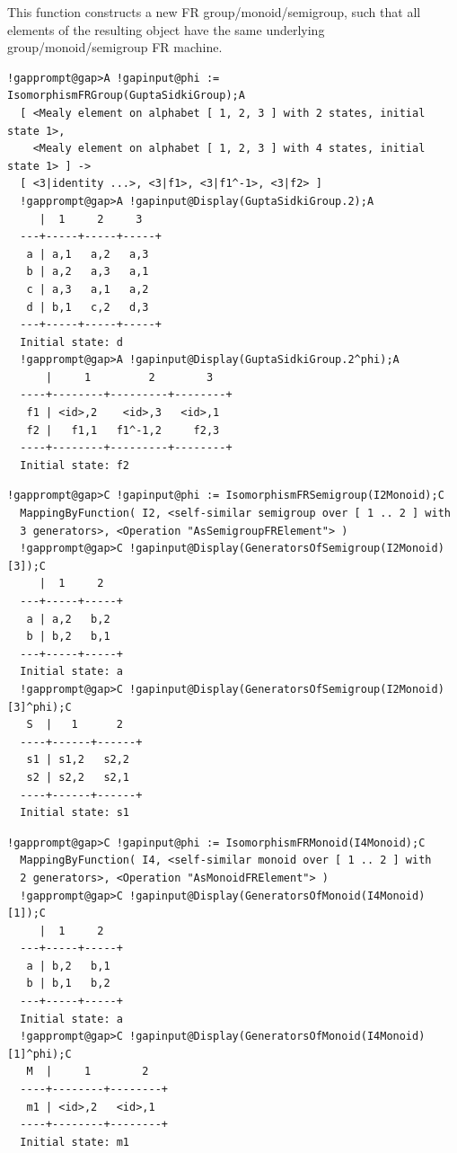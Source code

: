\documentclass[a4paper,11pt]{report}
\begin{document}
{{{ This function constructs a new FR group/monoid/semigroup, such that all
elements of the resulting object have the same underlying
group/monoid/semigroup FR machine. 
\begin{Verbatim}[commandchars=!@A,fontsize=\small,frame=single,label=Example]
  !gapprompt@gap>A !gapinput@phi := IsomorphismFRGroup(GuptaSidkiGroup);A
  [ <Mealy element on alphabet [ 1, 2, 3 ] with 2 states, initial state 1>,
    <Mealy element on alphabet [ 1, 2, 3 ] with 4 states, initial state 1> ] ->
  [ <3|identity ...>, <3|f1>, <3|f1^-1>, <3|f2> ]
  !gapprompt@gap>A !gapinput@Display(GuptaSidkiGroup.2);A
     |  1     2     3
  ---+-----+-----+-----+
   a | a,1   a,2   a,3
   b | a,2   a,3   a,1
   c | a,3   a,1   a,2
   d | b,1   c,2   d,3
  ---+-----+-----+-----+
  Initial state: d
  !gapprompt@gap>A !gapinput@Display(GuptaSidkiGroup.2^phi);A
      |     1         2        3
  ----+--------+---------+--------+
   f1 | <id>,2    <id>,3   <id>,1
   f2 |   f1,1   f1^-1,2     f2,3
  ----+--------+---------+--------+
  Initial state: f2
\end{Verbatim}
 
\begin{Verbatim}[commandchars=!@C,fontsize=\small,frame=single,label=Example]
  !gapprompt@gap>C !gapinput@phi := IsomorphismFRSemigroup(I2Monoid);C
  MappingByFunction( I2, <self-similar semigroup over [ 1 .. 2 ] with
  3 generators>, <Operation "AsSemigroupFRElement"> )
  !gapprompt@gap>C !gapinput@Display(GeneratorsOfSemigroup(I2Monoid)[3]);C
     |  1     2
  ---+-----+-----+
   a | a,2   b,2
   b | b,2   b,1
  ---+-----+-----+
  Initial state: a
  !gapprompt@gap>C !gapinput@Display(GeneratorsOfSemigroup(I2Monoid)[3]^phi);C
   S  |   1      2
  ----+------+------+
   s1 | s1,2   s2,2
   s2 | s2,2   s2,1
  ----+------+------+
  Initial state: s1
\end{Verbatim}
 
\begin{Verbatim}[commandchars=!@C,fontsize=\small,frame=single,label=Example]
  !gapprompt@gap>C !gapinput@phi := IsomorphismFRMonoid(I4Monoid);C
  MappingByFunction( I4, <self-similar monoid over [ 1 .. 2 ] with
  2 generators>, <Operation "AsMonoidFRElement"> )
  !gapprompt@gap>C !gapinput@Display(GeneratorsOfMonoid(I4Monoid)[1]);C
     |  1     2
  ---+-----+-----+
   a | b,2   b,1
   b | b,1   b,2
  ---+-----+-----+
  Initial state: a
  !gapprompt@gap>C !gapinput@Display(GeneratorsOfMonoid(I4Monoid)[1]^phi);C
   M  |     1        2
  ----+--------+--------+
   m1 | <id>,2   <id>,1
  ----+--------+--------+
  Initial state: m1
\end{Verbatim}
 }

}}
\end{document}
